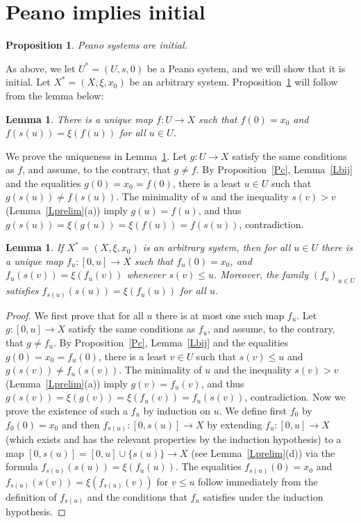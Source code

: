 \documentclass[12pt,letterpaper]{article}
\newtheorem{lem}[thm]{Lemma} %
\newtheorem{prop}[thm]{Proposition}
\begin{document}
\section{Peano implies initial} %

\begin{prop}\label{PP2i} 
Peano systems are initial. 
\end{prop} 

As above, we let \(U^*=(U,s,0)\) be a Peano system, and we will show that it is initial. Let \(X^*=(X,\xi,x_0)\) be an arbitrary system. Proposition~\ref{PP2i} will follow from the lemma below: 

\begin{lem}\label{LU2X} 
There is a unique map \(f:U\to X\) such that \(f(0)=x_0\) and \(f(s(u))=\xi(f(u))\) for all \(u\in U\).  
\end{lem} 

We prove the uniqueness in Lemma~\ref{LU2X}. Let \(g:U\to X\) satisfy the same conditions as \(f\), and assume, to the contrary, that \(g\ne f\). By Proposition~\ref{Pc}, Lemma~\ref{Lbij} and the equalities \(g(0)=x_0=f(0)\), there is a least \(u\in U\) such that \(g(s(u))\ne f(s(u))\). The minimality of \(u\) and the inequality \(s(v)>v\) (Lemma~\ref{Lprelim}(a)) imply \(g(u)=f(u)\), and thus \(g(s(u))=\xi(g(u))=\xi(f(u))=f(s(u))\), contradiction. 

\begin{lem}\label{Lrec} 
If \(X^*=(X,\xi,x_0)\) is an arbitrary system, then for all \(u\in U\) there is a unique map \(f_u:[0,u]\to X\) such that \(f_u(0)=x_0\), and \(f_u(s(v))=\xi(f_u(v))\) whenever \(s(v)\le u\). Moreover, the family \((f_u)_{u\in U}\) satisfies \(f_{s(u)}(s(u))=\xi(f_u(u))\) for all \(u\). 
\end{lem} 
\begin{proof} 
We first prove that for all \(u\) there is at most one such map \(f_u\). Let \(g:[0,u]\to X\) satisfy the same conditions as \(f_u\), and assume, to the contrary, that \(g\ne f_u\). By Proposition~\ref{Pc}, Lemma~\ref{Lbij} and the equalities \(g(0)=x_0=f_u(0)\), there is a least \(v\in U\) such that \(s(v)\le u\) and \(g(s(v))\ne f_u(s(v))\). The minimality of \(u\) and the inequality \(s(v)>v\) (Lemma~\ref{Lprelim}(a)) imply \(g(v)=f_u(v)\), and thus \(g(s(v))=\xi(g(v))=\xi(f_u(v))=f_u(s(v))\), contradiction. Now we prove the existence of such a \(f_u\) by induction on \(u\). We define first \(f_0\) by \(f_0(0)=x_0\) and then \(f_{s(u)}:[0,s(u)]\to X\) by extending \(f_u:[0,u]\to X\) (which exists and has the relevant properties by the induction hypothesis) to a map \([0,s(u)]=[0,u]\cup\{s(u)\}\to X\) (see Lemma~\ref{Lprelim}(d)) via the formula \(f_{s(u)}(s(u))=\xi(f_u(u))\). The equalities \(f_{s(u)}(0)=x_0\) and \(f_{s(u)}(s(v))=\xi(f_{s(u)}(v))\) for \(v\le u\) follow immediately from the definition of \(f_{s(u)}\) and the conditions that \(f_u\) satisfies under the induction hypothesis. 
\end{proof} 
\end{document}
